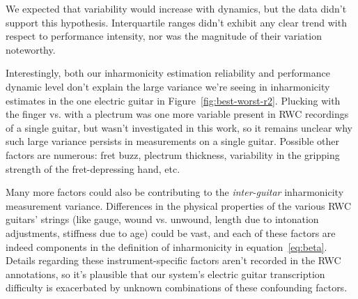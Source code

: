 \documentclass[12pt]{cmuthesis}
\begin{document}
We expected that variability would increase with dynamics, but the data didn't support this hypothesis. Interquartile ranges didn't exhibit any clear trend with respect to performance intensity, nor was the magnitude of their variation noteworthy. 

Interestingly, both our inharmonicity estimation reliability and performance dynamic level don't explain the large variance we're seeing in inharmonicity estimates in the one electric guitar in Figure~\ref{fig:best-worst-r2}. Plucking with the finger vs. with a plectrum was one more variable present in RWC recordings of a single guitar, but wasn't investigated in this work, so it remains unclear why such large variance persists in measurements on a single guitar. Possible other factors are numerous: fret buzz, plectrum thickness, variability in the gripping strength of the fret-depressing hand, etc.

Many more factors could also be contributing to the \textit{inter-guitar} inharmonicity measurement variance. Differences in the physical properties of the various RWC guitars' strings (like gauge, wound vs. unwound, length due to intonation adjustments, stiffness due to age) could be vast, and each of these factors are indeed components in the definition of inharmonicity in equation~\eqref{eq:beta}. Details regarding these instrument-specific factors aren't recorded in the RWC annotations, so it's plausible that our system's electric guitar transcription difficulty is exacerbated by unknown combinations of these confounding factors. 
\end{document}
